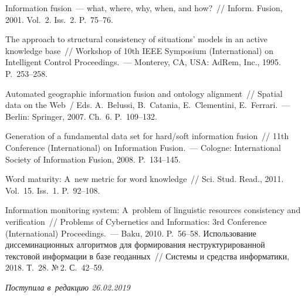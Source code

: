  \begin{multicols}{2}

\renewcommand{\bibname}{\protect\rmfamily Литература}

{\small\frenchspacing
{\baselineskip=10.5pt
\begin{thebibliography}{99}

 Information fusion~--- what, where, why, when, and how?~// 
Inform. Fusion, 2001. Vol.~2. Iss.~2. P.~75--76.

 The approach to structural consistency of situations' models in an 
active knowledge base~// Workshop of 10th IEEE Symposium 
(International) on Intelligent Control Proceedings.~--- Monterey, CA, USA: AdRem, 
Inc., 1995. P.~253--258.

 Automated geographic information fusion and 
ontology alignment~// Spatial data on the Web~/ Eds. A.~Belussi, B.~Catania, 
E.~Clementini, E.~Ferrari.~--- Berlin: Springer, 2007. Ch.~6. P.~109--132. 

 Generation of a fundamental data set for hard/soft information 
fusion~// 11th Conference (International) on Information Fusion.~--- Cologne: 
International Society of Information Fusion, 2008. P.~134--145.




 Word maturity: A~new metric 
for word knowledge~// Sci. Stud. Read., 2011. Vol.~15. Iss.~1. 
P.~92--108. 

 Information monitoring system: A~problem of 
linguistic resources consistency and verification~// Problems of Cybernetics and 
Informatics: 3rd Conference (International) Proceedings.~--- Baku, 2010.  
P.~56--58.
 Использование диссеминационных 
алгоритмов для формирования неструктурированной текстовой информации 
в базе геоданных~// Системы и средства информатики, 2018. Т.~28. №\,2. 
С.~42--59. 

\end{thebibliography}
} }

\end{multicols}

 \label{end\stat}

 \vspace*{-9pt}

\hfill{\small\textit{Поступила в~редакцию 26.02.2019}}


\renewcommand{\figurename}{\protect\bf Рис.}
\renewcommand{\tablename}{\protect\bf Таблица}